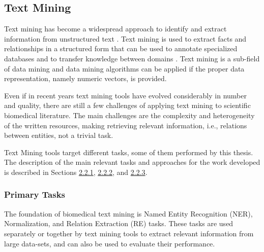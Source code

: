 \documentclass[11pt]{article}
\begin{document}
\hypertarget{4}{\subsection{Text Mining}}

Text mining has become a widespread approach to identify and extract information from unstructured text \cite{10.1371/journal.pcbi.1005962}. Text mining is used to extract facts and relationships in a structured form that can be used to annotate specialized databases and to transfer knowledge between domains \cite{FLEUREN201597}. Text mining is a sub-field of data mining and data mining algorithms can be applied if the proper data representation, namely numeric vectors, is provided.

Even if in recent years text mining tools have evolved considerably in number and quality, there are still a few challenges of applying text mining to scientific biomedical literature. The main challenges are the complexity and heterogeneity of the written resources, making retrieving relevant information, i.e., relations between entities, not a trivial task.

Text Mining tools target different tasks, some of them performed by this thesis. The description of the main relevant tasks and approaches for the work developed is described in Sections \hyperlink{5}{2.2.1}, \hyperlink{6}{2.2.2}, and \hyperlink{7}{2.2.3}. 


\hypertarget{5}{\subsubsection{Primary Tasks}}

The foundation of biomedical text mining is Named Entity Recognition (NER), Normalization, and Relation Extraction (RE) tasks. These tasks are used separately or together by text mining tools to extract relevant information from large data-sets, and can also be used to evaluate their performance.
\end{document}
